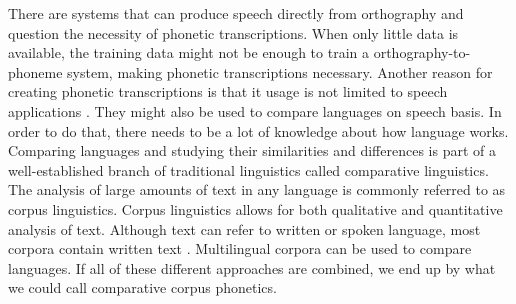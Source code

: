 There are systems that can produce speech directly from orthography and question the necessity of phonetic transcriptions. When only  little data is available, the training data might not be enough to train a orthography-to-phoneme system, making phonetic transcriptions necessary. Another reason for creating phonetic transcriptions is that it usage is not limited to speech applications \citep{mortensen-etal-2018-epitran}. They might also be used to compare languages on speech basis. In order to do that, there needs to be a lot of knowledge about how language works. Comparing languages and studying their similarities and differences is part of a well-established branch of traditional linguistics called comparative linguistics. The analysis of large amounts of text in any language is commonly referred to as corpus linguistics. Corpus linguistics allows for both qualitative and quantitative analysis of text. Although text can refer to written or spoken language, most corpora contain written text \citep{McEnery&Hardie.2011}. Multilingual corpora can be used to compare languages. If all of these different approaches are combined, we end up by what we could call comparative corpus phonetics. 


